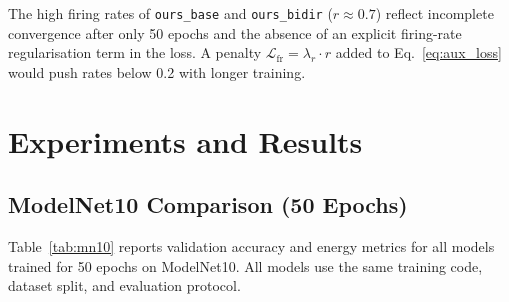 \documentclass[11pt,a4paper]{article}
\begin{document}
The high firing rates of \texttt{ours\_base} and \texttt{ours\_bidir}
($r \approx 0.7$) reflect incomplete convergence after only 50 epochs and the
absence of an explicit firing-rate regularisation term in the loss. A penalty
$\mathcal{L}_\text{fr} = \lambda_r \cdot r$ added to Eq.~\eqref{eq:aux_loss}
would push rates below 0.2 with longer training.

\section{Experiments and Results}

\subsection{ModelNet10 Comparison (50 Epochs)}

Table~\ref{tab:mn10} reports validation accuracy and energy metrics for all
models trained for 50 epochs on ModelNet10. All models use the same training
code, dataset split, and evaluation protocol.
\end{document}
